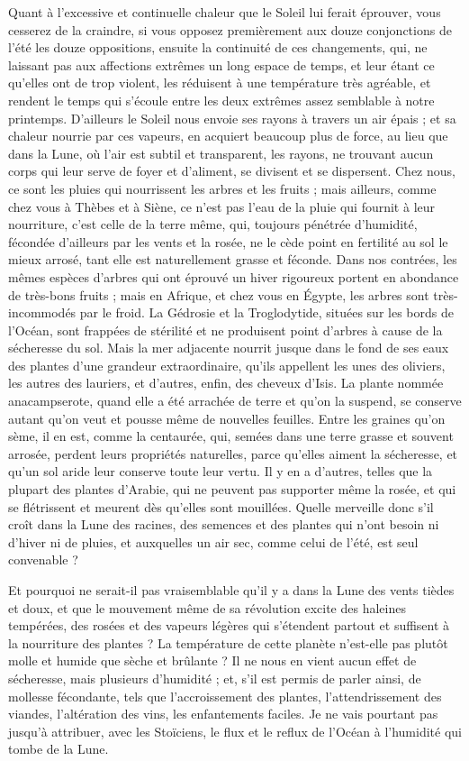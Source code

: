 \documentclass[a4paper, 11pt, oneside]{article}
\begin{document}
Quant à l'excessive et continuelle chaleur que le Soleil lui ferait éprouver, vous cesserez de la craindre, si vous opposez premièrement aux douze conjonctions de l'été les douze oppositions, ensuite la continuité de ces changements, qui, ne laissant pas aux affections extrêmes un long espace de temps, et leur étant ce qu'elles ont de trop violent, les réduisent à une température très agréable, et rendent le temps qui s'écoule entre les deux extrêmes assez semblable à notre printemps. D'ailleurs le Soleil nous envoie ses rayons à travers un air épais ; et sa chaleur nourrie par ces vapeurs, en acquiert beaucoup plus de force, au lieu que dans la Lune, où l'air est subtil et transparent, les rayons, ne trouvant aucun corps qui leur serve de foyer et d'aliment, se divisent et se dispersent. Chez nous, ce sont les pluies qui nourrissent les arbres et les fruits ; mais ailleurs, comme chez vous à Thèbes et à Siène, ce n'est pas l'eau de la pluie qui fournit à leur nourriture, c'est celle de la terre même, qui, toujours pénétrée d'humidité, fécondée d'ailleurs par les vents et la rosée, ne le cède point en fertilité au sol le mieux arrosé, tant elle est naturellement grasse et féconde. Dans nos contrées, les mêmes espèces d'arbres qui ont éprouvé un hiver rigoureux portent en abondance de très-bons fruits ; mais en Afrique, et chez vous en Égypte, les arbres sont très-incommodés par le froid. La Gédrosie et la Troglodytide, situées sur les bords de l'Océan, sont frappées de stérilité et ne produisent point d'arbres à cause de la sécheresse du sol. Mais la mer adjacente nourrit jusque dans le fond de ses eaux des plantes d'une grandeur extraordinaire, qu'ils appellent les unes des oliviers, les autres des lauriers, et d'autres, enfin, des cheveux d'Isis. La plante nommée anacampserote, quand elle a été arrachée de terre et qu'on la suspend, se conserve autant qu'on veut et pousse même de nouvelles feuilles. Entre les graines qu'on sème, il en est, comme la centaurée, qui, semées dans une terre grasse et souvent arrosée, perdent leurs propriétés naturelles, parce qu'elles aiment la sécheresse, et qu'un sol aride leur conserve toute leur vertu. Il y en a d'autres, telles que la plupart des plantes d'Arabie, qui ne peuvent pas supporter même la rosée, et qui se flétrissent et meurent dès qu'elles sont mouillées. Quelle merveille donc s'il croît dans la Lune des racines, des semences et des plantes qui n'ont besoin ni d'hiver ni de pluies, et auxquelles un air sec, comme celui de l'été, est seul convenable ?

Et pourquoi ne serait-il pas vraisemblable qu'il y a dans la Lune des vents tièdes et doux, et que le mouvement même de sa révolution excite des haleines tempérées, des rosées et des vapeurs légères qui s'étendent partout et suffisent à la nourriture des plantes ? La température de cette planète n'est-elle pas plutôt molle et humide que sèche et brûlante ? Il ne nous en vient aucun effet de sécheresse, mais plusieurs d'humidité ; et, s'il est permis de parler ainsi, de mollesse fécondante, tels que l'accroissement des plantes, l'attendrissement des viandes, l'altération des vins, les enfantements faciles. Je ne vais pourtant pas jusqu'à attribuer, avec les Stoïciens, le flux et le reflux de l'Océan à l'humidité qui tombe de la Lune.
\end{document}
